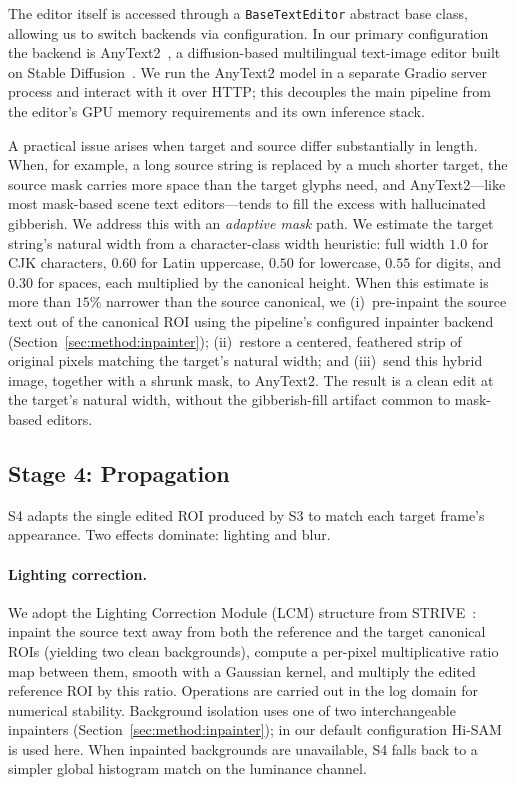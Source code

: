 The editor itself is accessed through a \texttt{BaseTextEditor}
abstract base class, allowing us to switch backends via
configuration. In our primary configuration the backend is
AnyText2~\citep{tuo2025anytext2}, a diffusion-based multilingual
text-image editor built on Stable
Diffusion~\citep{rombach2022stablediffusion}. We run the AnyText2
model in a separate Gradio server process and interact with it over
HTTP; this decouples the main pipeline from the editor's GPU memory
requirements and its own inference stack.

A practical issue arises when target and source differ substantially
in length. When, for example, a long source string is replaced by a
much shorter target, the source mask carries more space than the
target glyphs need, and AnyText2---like most mask-based scene text
editors---tends to fill the excess with hallucinated gibberish. We
address this with an \emph{adaptive mask} path. We estimate the
target string's natural width from a character-class width
heuristic: full width $1.0$ for CJK characters, $0.60$ for Latin
uppercase, $0.50$ for lowercase, $0.55$ for digits, and $0.30$ for
spaces, each multiplied by the canonical height. When this estimate
is more than $15\%$ narrower than the source canonical, we
(i)~pre-inpaint the source text out of the canonical ROI using the
pipeline's configured inpainter backend
(Section~\ref{sec:method:inpainter}); (ii)~restore a centered,
feathered strip of original pixels matching the target's natural
width; and (iii)~send this hybrid image, together with a shrunk
mask, to AnyText2. The result is a clean edit at the target's
natural width, without the gibberish-fill artifact common to
mask-based editors.

\subsection{Stage 4: Propagation}
\label{sec:method:s4}

S4 adapts the single edited ROI produced by S3 to match each
target frame's appearance. Two effects dominate: lighting and
blur.

\paragraph{Lighting correction.}
We adopt the Lighting Correction Module (LCM) structure from
STRIVE~\citep{subramanian2021strive}: inpaint the source text away
from both the reference and the target canonical ROIs (yielding
two clean backgrounds), compute a per-pixel multiplicative ratio
map between them, smooth with a Gaussian kernel, and multiply the
edited reference ROI by this ratio. Operations are carried out in
the log domain for numerical stability. Background isolation uses
one of two interchangeable inpainters (Section~\ref{sec:method:inpainter});
in our default configuration Hi-SAM~\citep{ye2024hisam} is used
here. When inpainted backgrounds are unavailable, S4 falls back to
a simpler global histogram match on the luminance channel.

